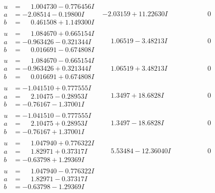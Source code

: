 \documentclass[1p]{elsarticle_modified}
\theoremstyle{definition}
\begin{document}
$$\begin{array}{c|c|c}
\begin{aligned}
u &= \phantom{-}1.004730 - 0.776456 I \\
a &= -2.08514 - 0.19800 I \\
b &= \phantom{-}0.461508 + 1.149300 I\end{aligned}
 & -2.03159 + 11.22630 I & \phantom{-0.000000 } 0 \\ \hline\begin{aligned}
u &= \phantom{-}1.084670 + 0.665154 I \\
a &= -0.963426 - 0.321344 I \\
b &= \phantom{-}0.016691 - 0.674808 I\end{aligned}
 & \phantom{-}1.06519 - 3.48213 I & \phantom{-0.000000 } 0 \\ \hline\begin{aligned}
u &= \phantom{-}1.084670 - 0.665154 I \\
a &= -0.963426 + 0.321344 I \\
b &= \phantom{-}0.016691 + 0.674808 I\end{aligned}
 & \phantom{-}1.06519 + 3.48213 I & \phantom{-0.000000 } 0 \\ \hline\begin{aligned}
u &= -1.041510 + 0.777555 I \\
a &= \phantom{-}2.10475 - 0.28953 I \\
b &= -0.76167 - 1.37001 I\end{aligned}
 & \phantom{-}1.3497 + 18.6828 I & \phantom{-0.000000 } 0 \\ \hline\begin{aligned}
u &= -1.041510 - 0.777555 I \\
a &= \phantom{-}2.10475 + 0.28953 I \\
b &= -0.76167 + 1.37001 I\end{aligned}
 & \phantom{-}1.3497 - 18.6828 I & \phantom{-0.000000 } 0 \\ \hline\begin{aligned}
u &= \phantom{-}1.047940 + 0.776322 I \\
a &= \phantom{-}1.82971 + 0.37317 I \\
b &= -0.63798 + 1.29369 I\end{aligned}
 & \phantom{-}5.53484 - 12.36040 I & \phantom{-0.000000 } 0 \\ \hline\begin{aligned}
u &= \phantom{-}1.047940 - 0.776322 I \\
a &= \phantom{-}1.82971 - 0.37317 I \\
b &= -0.63798 - 1.29369 I\end{aligned}

\end{array}$$
\end{document}
